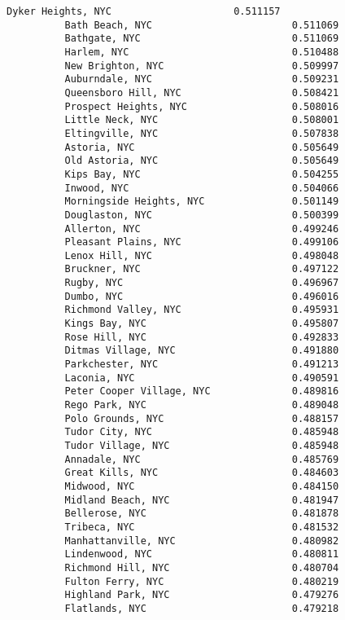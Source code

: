 \documentclass[11pt]{article}
\begin{document}
\begin{Verbatim}[commandchars=\\\{\}]
          Dyker Heights, NYC                     0.511157
          Bath Beach, NYC                        0.511069
          Bathgate, NYC                          0.511069
          Harlem, NYC                            0.510488
          New Brighton, NYC                      0.509997
          Auburndale, NYC                        0.509231
          Queensboro Hill, NYC                   0.508421
          Prospect Heights, NYC                  0.508016
          Little Neck, NYC                       0.508001
          Eltingville, NYC                       0.507838
          Astoria, NYC                           0.505649
          Old Astoria, NYC                       0.505649
          Kips Bay, NYC                          0.504255
          Inwood, NYC                            0.504066
          Morningside Heights, NYC               0.501149
          Douglaston, NYC                        0.500399
          Allerton, NYC                          0.499246
          Pleasant Plains, NYC                   0.499106
          Lenox Hill, NYC                        0.498048
          Bruckner, NYC                          0.497122
          Rugby, NYC                             0.496967
          Dumbo, NYC                             0.496016
          Richmond Valley, NYC                   0.495931
          Kings Bay, NYC                         0.495807
          Rose Hill, NYC                         0.492833
          Ditmas Village, NYC                    0.491880
          Parkchester, NYC                       0.491213
          Laconia, NYC                           0.490591
          Peter Cooper Village, NYC              0.489816
          Rego Park, NYC                         0.489048
          Polo Grounds, NYC                      0.488157
          Tudor City, NYC                        0.485948
          Tudor Village, NYC                     0.485948
          Annadale, NYC                          0.485769
          Great Kills, NYC                       0.484603
          Midwood, NYC                           0.484150
          Midland Beach, NYC                     0.481947
          Bellerose, NYC                         0.481878
          Tribeca, NYC                           0.481532
          Manhattanville, NYC                    0.480982
          Lindenwood, NYC                        0.480811
          Richmond Hill, NYC                     0.480704
          Fulton Ferry, NYC                      0.480219
          Highland Park, NYC                     0.479276
          Flatlands, NYC                         0.479218

\end{Verbatim}
\end{document}
